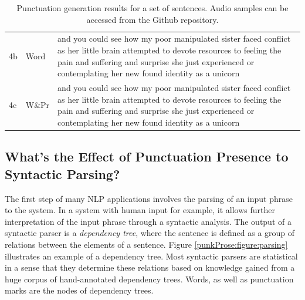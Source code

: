 \begin{table}[tbp]
\begin{tabular}{p{0.5cm}|l|p{12cm}}
4b & Word & and you could see how my poor manipulated sister faced conflict as her little brain attempted to devote resources to feeling the pain and suffering and surprise\mycirc{\textbf{,}} she just experienced or contemplating her new found identity as a unicorn\mycirc{\textbf{.}} \\ 
4c & W\&Pr & and you could see how my poor manipulated sister faced conflict\mycirc{\textbf{,}} as her little brain attempted to devote resources to feeling the pain and suffering and surprise she just experienced\mycirc{\textbf{,}} or contemplating her new found identity as a unicorn\mycirc{\textbf{.}} \\ \midrule
\end{tabular}
\caption{Punctuation generation results for a set of sentences. Audio samples can be accessed from the Github repository\protect\footnotemark.}
\label{examples}
\end{table}


\subsection{What's the Effect of Punctuation Presence to Syntactic Parsing?}
\label{punkProse:experiments:q2}
The first step of many NLP applications involves the parsing of an input phrase to the system. In a system with human input for example, it allows further interpretation of the input phrase through a syntactic analysis. The output of a syntactic parser is a \textit{dependency tree}, where the sentence is defined as a group of relations between the elements of a sentence. Figure \ref{punkProse:figure:parsing} illustrates an example of a dependency tree. Most syntactic parsers are statistical in a sense that they determine these relations based on knowledge gained from a huge corpus of hand-annotated dependency trees. Words, as well as punctuation marks are the nodes of dependency trees. 

